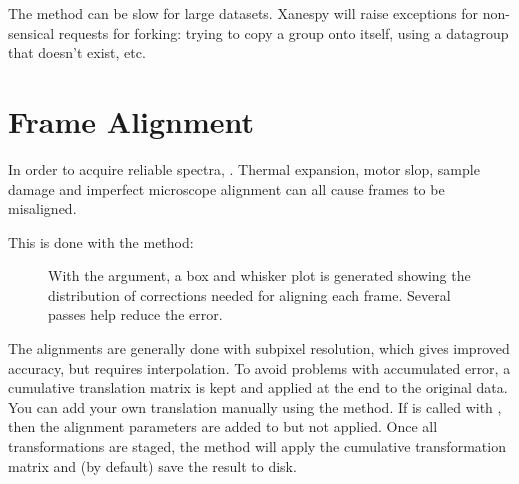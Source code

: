 \documentclass[letterpaper,10pt,english]{sphinxmanual}
\begin{document}
The {\hyperref[\detokenize{xanespy:xanespy.xanes_frameset.XanesFrameset.fork_data_group}]{}}
method can be slow for large datasets. Xanespy will raise exceptions
for non-sensical requests for forking: trying to copy a group onto
itself, using a datagroup that doesn’t exist, etc.


\section{Frame Alignment}
\label{\detokenize{analysis:frame-alignment}}
In order to acquire reliable spectra, . Thermal expansion, motor slop, sample
damage and imperfect microscope alignment can all cause frames to be
misaligned. 

This is done with the  method:

\begin{sphinxVerbatim}[commandchars=\\\{\}]
 
  

 
\end{sphinxVerbatim}
\begin{figure}[htbp]
\centering
\capstart

\noindent{}
\caption{With the  argument, a box and whisker plot is
generated showing the distribution of corrections needed for
aligning each frame. Several passes help reduce the error.}\label{\detokenize{analysis:id1}}\end{figure}

The alignments are generally done with subpixel resolution, which
gives improved accuracy, but requires interpolation. To avoid problems
with accumulated error, a cumulative translation matrix is kept and
applied at the end to the original data. You can add your own
translation manually using the  method. If
 is called with , then the alignment
parameters are added to  but not
applied. Once all transformations are staged, the
 method will apply the cumulative
transformation matrix and (by default) save the result to disk.
\end{document}
